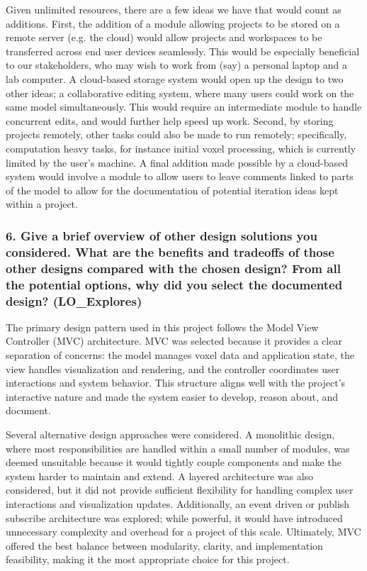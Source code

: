 \documentclass[12pt, titlepage]{article}
\begin{document}
Given unlimited resources, there are a few ideas we have that would count as additions. First, the addition of a module allowing projects to be stored on a remote server (e.g. the cloud) would allow projects and workspaces to be transferred across end user devices seamlessly. This would be especially beneficial to our stakeholders, who may wish to work from (say) a personal laptop and a lab computer. A cloud-based storage system would open up the design to two other ideas; a collaborative editing system, where many users could work on the same model simultaneously. This would require an intermediate module to handle concurrent edits, and would further help speed up work. Second, by storing projects remotely, other tasks could also be made to run remotely; specifically, computation heavy tasks, for instance initial voxel processing, which is currently limited by the user's machine. A final addition made possible by a cloud-based system would involve a module to allow users to leave comments linked to parts of the model to allow for the documentation of potential iteration ideas kept within a project.

\subsubsection*{6. Give a brief overview of other design solutions you considered.  What
are the benefits and tradeoffs of those other designs compared with the chosen
design?  From all the potential options, why did you select the documented design?
(LO\_Explores)} The primary design pattern used in this project follows the Model View Controller (MVC) architecture. MVC was selected because it provides a clear separation of concerns: the model manages voxel data and application state, the view handles visualization and rendering, and the controller coordinates user interactions and system behavior. This structure aligns well with the project’s interactive nature and made the system easier to develop, reason about, and document.

Several alternative design approaches were considered. A monolithic design, where most responsibilities are handled within a small number of modules, was deemed unsuitable because it would tightly couple components and make the system harder to maintain and extend. A layered architecture was also considered, but it did not provide sufficient flexibility for handling complex user interactions and visualization updates. Additionally, an event driven or publish subscribe architecture was explored; while powerful, it would have introduced unnecessary complexity and overhead for a project of this scale. Ultimately, MVC offered the best balance between modularity, clarity, and implementation feasibility, making it the most appropriate choice for this project.
\end{document}
